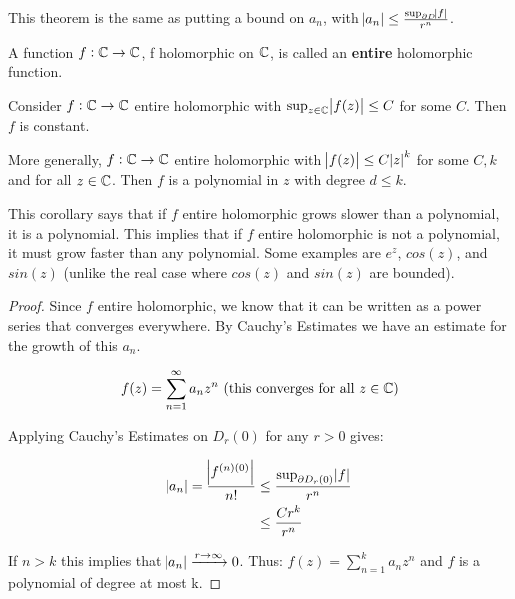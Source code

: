 \begin{note}
This theorem is the same as putting a bound on $a_n$, with $\abs{a_n} \leq \frac{\sup_{\partial D}\abs{f}}{r^n}$.
\end{note}


\begin{definition}
A function $f:\mathbb{C} \to \mathbb{C}$, f holomorphic on $\mathbb{C}$, is called an \textbf{entire} holomorphic function.
\end{definition}


\begin{corollary}[Liouville]

Consider $f:\mathbb{C} \to \mathbb{C}$ entire holomorphic with $\sup_{z\in \mathbb{C}}\abs{f(z)} \leq C$ for some $C$. Then $f$ is constant.

More generally, $f:\mathbb{C} \to \mathbb{C}$ entire holomorphic with $\abs{f(z)} \leq C\abs{z}^k$ for some $C, k$ and for all $z \in \mathbb{C}$. Then $f$ is a polynomial in $z$ with degree $d\leq k$.

\end{corollary}


\begin{note}
This corollary says that if $f$ entire holomorphic grows slower than a polynomial, it is a polynomial. This implies that if $f$ entire holomorphic is not a polynomial, it must grow faster than any polynomial. Some examples are $e^z$, $cos(z)$, and $sin(z)$ (unlike the real case where $cos(z)$ and $sin(z)$ are bounded).
\end{note}

\begin{proof}
Since $f$ entire holomorphic, we know that it can be written as a power series that converges everywhere. By Cauchy's Estimates we have an estimate for the growth of this $a_n$.

\begin{align*}
    f(z) = \sum_{n=1}^\infty a_n z^n \text{ (this converges for all $z\in \mathbb{C}$)}
\end{align*}

Applying Cauchy's Estimates on $D_r(0)$ for any $r>0$ gives:

\begin{align*}
    \abs{a_n} = \frac{\abs{f^{(n) (0)  }}}{n!} &\leq \frac{\sup_{\partial D_r(0)}\abs{f}}{r^n}\\
    &\leq \frac{Cr^k}{r^n}
\end{align*}

If $n>k$ this implies that $\abs{a_n} \xrightarrow[]{r\to \infty} 0$. Thus: $f(z) = \sum_{n=1}^{k} a_n z^n$ and $f$ is a polynomial of degree at most k.

\end{proof}


